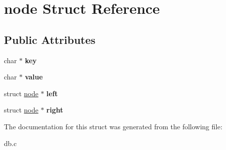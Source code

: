 \hypertarget{structnode}{\section{node Struct Reference}
\label{structnode}
}
\subsection*{Public Attributes}
\begin{DoxyCompactItemize}
\item 
\hypertarget{structnode_a69c02a14f8fdbc19c86fcd22854a4bda}{char $\ast$ {\bfseries key}}\label{structnode_a69c02a14f8fdbc19c86fcd22854a4bda}

\item 
\hypertarget{structnode_a0d2c1eb2a9662a891bb09807232d7f9f}{char $\ast$ {\bfseries value}}\label{structnode_a0d2c1eb2a9662a891bb09807232d7f9f}

\item 
\hypertarget{structnode_a3ce38490a651bfda86d88ff955e96abc}{struct \hyperlink{structnode}{node} $\ast$ {\bfseries left}}\label{structnode_a3ce38490a651bfda86d88ff955e96abc}

\item 
\hypertarget{structnode_a875f75abfe22103500535b179828e4e3}{struct \hyperlink{structnode}{node} $\ast$ {\bfseries right}}\label{structnode_a875f75abfe22103500535b179828e4e3}

\end{DoxyCompactItemize}


The documentation for this struct was generated from the following file\+:\begin{DoxyCompactItemize}
\item 
db.\+c\end{DoxyCompactItemize}
